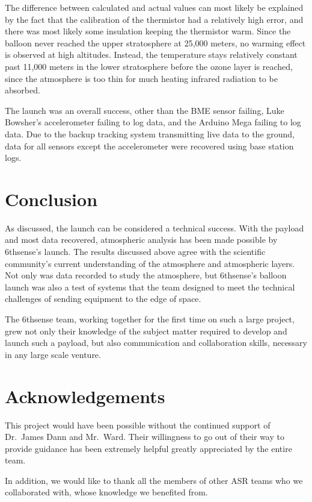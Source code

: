 \documentclass[12pt,]{article}
\begin{document}
The difference between calculated and actual values can most likely be
explained by the fact that the calibration of the thermistor had a
relatively high error, and there was most likely some insulation keeping
the thermistor warm. Since the balloon never reached the upper
stratosphere at 25,000 meters, no warming effect is observed at high
altitudes. Instead, the temperature stays relatively constant past
11,000 meters in the lower stratosphere before the ozone layer is
reached, since the atmosphere is too thin for much heating infrared
radiation to be absorbed.

The launch was an overall success, other than the BME sensor failing,
Luke Bowsher's accelerometer failing to log data, and the Arduino Mega
failing to log data. Due to the backup tracking system transmitting live
data to the ground, data for all sensors except the accelerometer were
recovered using base station logs.

\section{Conclusion}\label{conclusion}

As discussed, the launch can be considered a technical success. With the
payload and most data recovered, atmospheric analysis has been made
possible by 6thsense's launch. The results discussed above agree with
the scientific community's current understanding of the atmosphere and
atmospheric layers. Not only was data recorded to study the atmosphere,
but 6thsense's balloon launch was also a test of systems that the team
designed to meet the technical challenges of sending equipment to the
edge of space.

The 6thsense team, working together for the first time on such a large
project, grew not only their knowledge of the subject matter required to
develop and launch such a payload, but also communication and
collaboration skills, necessary in any large scale venture.

\section{Acknowledgements}\label{acknowledgements}

This project would have been possible without the continued support of
Dr.~James Dann and Mr.~Ward. Their willingness to go out of their way to
provide guidance has been extremely helpful greatly appreciated by the
entire team.

In addition, we would like to thank all the members of other ASR teams
who we collaborated with, whose knowledge we benefited from.
\end{document}
